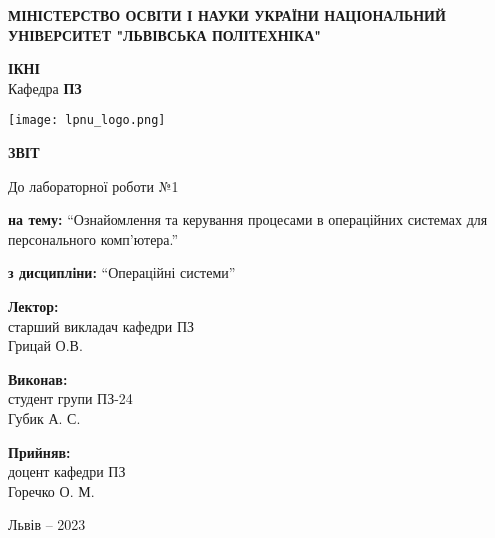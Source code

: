 \documentclass[12pt]{extarticle}
\begin{document}
\begin{titlepage}
    \begin{center}
        \textbf{\normalsize{\MakeUppercase{
            Міністерство Освіти і науки України
            Національний університет "Львівська політехніка"
        }}}

        \begin{flushright}
        \textbf{ІКНІ}\\
        Кафедра \textbf{ПЗ}
        \end{flushright}
        \vspace{15mm}

        \texttt{[image: lpnu\_logo.png]}

        \vspace*{\fill}

        \textbf{\normalsize{\MakeUppercase{Звіт}}}
            
        До лабораторної роботи №1

        \textbf{на тему:} “Ознайомлення та керування процесами
         в операційних системах для персонального комп'ютера.”

        \textbf{з дисципліни:} “Операційні системи”
            
        \vspace*{\fill}

        \begin{flushright}

            \textbf{Лектор:}\\
            старший викладач кафедри ПЗ\\
            Грицай О.В.\\
            \vspace{12pt}

            \textbf{Виконав:}\\
            студент групи ПЗ-24\\
            Губик А. С.\\
            \vspace{12pt}

            \textbf{Прийняв:}\\
            доцент кафедри ПЗ\\
            Горечко О. М.\\
        \vspace{12pt}
        \end{flushright}

        Львів -- 2023
            
            
    \end{center}
\end{titlepage}
\end{document}
